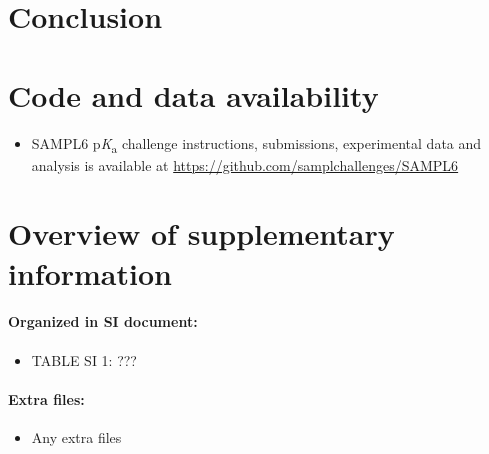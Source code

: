 \documentclass[9pt,lineno,final]{elife}
\newcommand{\pKa}{p\textit{K}\textsubscript{a}}
\begin{document}
\section{Conclusion}


\section{Code and data availability}
\begin{minipage}{15cm}
\begin{itemize}

\item SAMPL6 \pKa{} challenge instructions, submissions, experimental data and analysis is available at  \href{https://github.com/samplchallenges/SAMPL6}{https://github.com/samplchallenges/SAMPL6}

\end{itemize}
\end{minipage}


\section{Overview of supplementary information}

\paragraph{Organized in SI document:}

\begin{itemize}
\item TABLE SI 1: ???

\end{itemize}

\paragraph{Extra files:}  
\begin{itemize}
\item Any extra files
\end{itemize}


\end{document}

